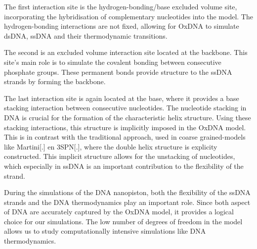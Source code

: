 The first interaction site is the hydrogen-bonding/base excluded volume site,
incorporating the hybridisation of complementary nucleotides into the model. The
hydrogen-bonding interactions are not fixed, allowing for OxDNA to simulate dsDNA, ssDNA
and their thermodynamic transitions.

The second is an excluded volume interaction site located at the backbone.
This site's main role is to simulate the covalent bonding between consecutive phosphate
groups. These permanent bonds provide structure to the ssDNA strands by forming the
backbone.

The last interaction site is again located at the base, where it provides a base stacking
interaction between consecutive nucleotides. The nucleotide stacking in DNA is crucial
for the formation of the characteristic helix structure. Using these stacking
interactions, this structure is implicitly imposed in the OxDNA model. This is in
contrast with the traditional approach, used in coarse grained-models like Martini[.] en
3SPN[.],
where the double helix structure is explicity constructed. This
implicit structure allows for the
unstacking of nucleotides, which especially in ssDNA is an important contribution to the
flexibility of the strand.

During the simulations of the DNA nanopiston, both the flexibility of the ssDNA strands
and the DNA thermodynamics play an important role. Since both aspect of DNA are
accurately captured by the OxDNA model, it provides a logical choice
for our simulations. The low number of degrees of freedom in the model allows us to
study computationally intensive simulations like DNA thermodynamics.

